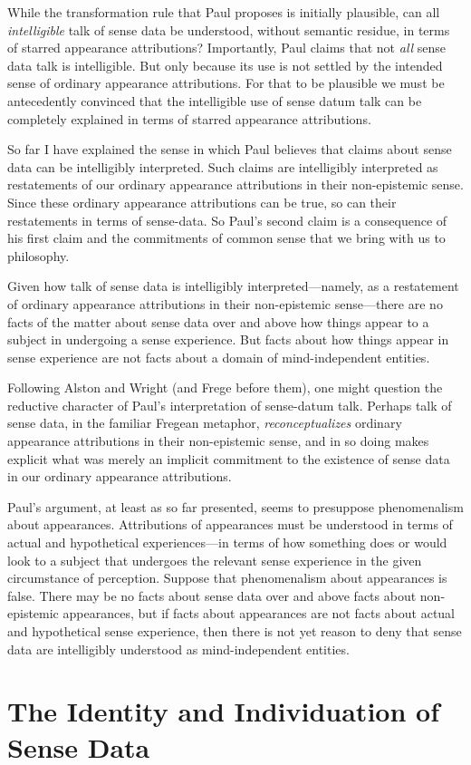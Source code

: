 \documentclass[11pt]{article}
\begin{document}
\begin{discussion}
    While the transformation rule that Paul proposes is initially plausible, can all \emph{intelligible} talk of sense data be understood, without semantic residue, in terms of starred appearance attributions? Importantly, Paul claims that not \emph{all} sense data talk is intelligible. But only because its use is not settled by the intended sense of ordinary appearance attributions. For that to be plausible we must be antecedently convinced that the intelligible use of sense datum talk can be completely explained in terms of starred appearance attributions.
\end{discussion}

So far I have explained the sense in which Paul believes that claims about sense data can be intelligibly interpreted. Such claims are intelligibly interpreted as restatements of our ordinary appearance attributions in their non-epistemic sense. Since these ordinary appearance attributions can be true, so can their restatements in terms of sense-data. So Paul's second claim is a consequence of his first claim and the commitments of common sense that we bring with us to philosophy.

Given how talk of sense data is intelligibly interpreted---namely, as a restatement of ordinary appearance attributions in their non-epistemic sense\----there are no facts of the matter about sense data over and above how things appear to a subject in undergoing a sense experience. But facts about how things appear in sense experience are not facts about a domain of mind-independent entities. 

\begin{discussion}
    Following Alston and Wright (and Frege before them), one might question the reductive character of Paul's interpretation of sense-datum talk. Perhaps talk of sense data, in the familiar Fregean metaphor, \emph{reconceptualizes} ordinary appearance attributions in their non-epistemic sense, and in so doing makes explicit what was merely an implicit commitment to the existence of sense data in our ordinary appearance attributions.
    
    Paul's argument, at least as so far presented, seems to presuppose phenomenalism about appearances. Attributions of appearances must be understood in terms of actual and hypothetical experiences---in terms of how something does or would look to a subject that undergoes the relevant sense experience in the given circumstance of perception. Suppose that phenomenalism about appearances is false. There may be no facts about sense data over and above facts about non-epistemic appearances, but if facts about appearances are not facts about actual and hypothetical sense experience, then there is not yet reason to deny that sense data are intelligibly understood as mind-independent entities.
\end{discussion}


\section{The Identity and Individuation of Sense Data} %
\label{sec:the_identity_and_individuation_of_sense_data}

\end{document}
